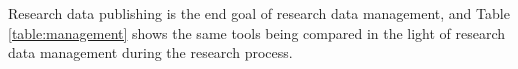 Research data publishing is the end goal of research data management, and
Table \ref{table:management} shows the same tools being compared in the light
of research data management during the research process.

